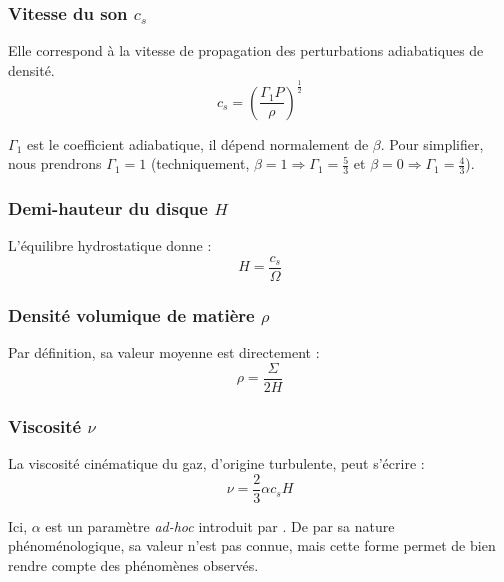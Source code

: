 \subsubsection{\texorpdfstring{Vitesse du son $c_s$}{Vitesse du son cs}}

Elle correspond à la vitesse de propagation des perturbations adiabatiques de
densité.
\begin{equation}
    \label{eq:vitesse_son}
    c_s = \left( \frac{\Gamma_1 P}{\rho} \right)^\frac{1}{2}
\end{equation}

$\Gamma_1$ est le coefficient adiabatique, il dépend normalement de $\beta$.
Pour simplifier, nous prendrons $\Gamma_1 = 1$ (techniquement, $\beta = 1
\Rightarrow \Gamma_1 = \frac{5}{3}$ et $\beta = 0 \Rightarrow \Gamma_1
= \frac{4}{3}$).

\subsubsection{\texorpdfstring{Demi-hauteur du disque $H$}{Demi-hauteur du disque H}}

L’équilibre hydrostatique donne :
\begin{equation}
    \label{eq:demi_hauteur}
    H = \frac{c_s}{\Omega}
\end{equation}

\subsubsection{\texorpdfstring{Densité volumique de matière $\rho$}{Densité volumique de matière ρ}}

Par définition, sa valeur moyenne est directement :
\begin{equation}
    \label{eq:densite_volumique}
    \rho = \frac{\Sigma}{2 H}
\end{equation}

\subsubsection{\texorpdfstring{Viscosité $\nu$}{Viscosité ν}}

La viscosité cinématique du gaz, d’origine turbulente, peut s’écrire :
\begin{equation}
    \label{eq:viscosite}
    \nu = \frac{2}{3} \alpha c_s H
\end{equation}

Ici, $\alpha$ est un paramètre \textit{ad-hoc} introduit par \citet{1973}. De
par sa nature phénoménologique, sa valeur n’est pas connue, mais cette forme
permet de bien rendre compte des phénomènes observés.

